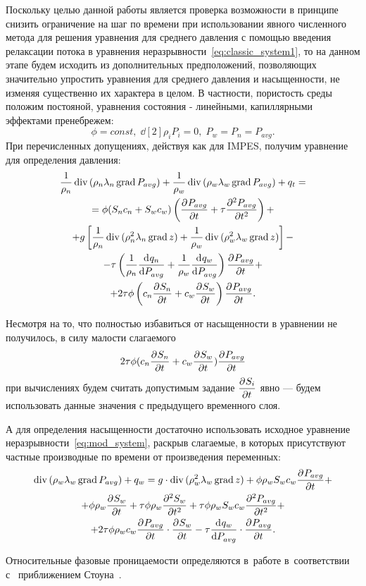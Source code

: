 Поскольку целью данной работы является проверка возможности в принципе снизить ограничение на шаг по времени при
использовании явного численного метода для решения уравнения для среднего давления
с помощью введения релаксации потока в уравнения неразрывности~\eqref{eq:classic_system1}, то на данном этапе
будем исходить из дополнительных предположений, позволяющих значительно упростить уравнения для среднего давления
и насыщенности, не изменяя существенно их характера в целом. В частности, пористость среды положим постояной,
уравнения состояния - линейными, капиллярными эффектами пренебрежем:
\begin{equation}
\phi = const,\; \dd[2]{\rho_i}{P_i} = 0,\;P_w = P_n = P_{avg}.
\end{equation}
При перечисленных допущениях, действуя как для IMPES, получим уравнение для определения давления:
\begin{equation} \label{eq:mod_pressure}
 \begin{gathered}
  \frac{1}{\rho_n} \diver{ (\rho_n\lambda_n\grad{ P_{avg}})} + \frac{1}{\rho_w} \diver{ (\rho_w\lambda_w\grad{ P_{avg}})} + q_t =\\
  = \phi (S_n c_n + S_w c_w) \left( \pd{P_{avg}}{t} + \tau \pd[2]{P_{avg}}{t} \right) +\\
  + g \left[ \frac{1}{\rho_n} \diver{ (\rho_n^2\lambda_n\grad{ z})} + \frac{1}{\rho_w} \diver{ (\rho_w^2\lambda_w\grad{ z})} \right]  -\\
  -  \tau \left(\frac{1}{\rho_n}\dd{q_n}{P_{avg}} + \frac{1}{\rho_w}\dd{q_w}{P_{avg}}\right) \pd{P_{avg}}{t} +\\
  + 2 \tau \phi \left(c_n \pd{S_n}{t} + c_w\pd{S_w}{t}\right) \pd{P_{avg}}{t}.
 \end{gathered}
\end{equation}

Несмотря на то, что полностью избавиться от насыщенности в уравнении не получилось, в силу малости слагаемого
\begin{equation*}
 2 \tau \phi (c_n \pd{S_n}{t} + c_w\pd{S_w}{t}) \pd{P_{avg}}{t}
\end{equation*}
при вычислениях будем считать допустимым задание $\pd{S_i}{t}$ явно --- будем использовать данные
значения с предыдущего временного слоя.

А для определения насыщенности достаточно использовать исходное уравнение неразрывности~\eqref{eq:mod_system},
раскрыв слагаемые, в которых присутствуют частные производные по времени от произведения переменных:
\begin{equation} \label{eq:mod_saturation}
 \begin{gathered}
  \diver{ (\rho_w\lambda_w \grad{ P_{avg}})} + q_w = g \cdot \diver{ (\rho_w^2\lambda_w \grad{ z})} + \phi \rho_w S_w c_w  \pd{P_{avg}}{t} +\\
  + \phi \rho_w \pd{S_w}{t} + \tau \phi \rho_w \pd[2]{S_w}{t} + \tau \phi \rho_w S_w c_w \pd[2]{P_{avg}}{t} +\\
  + 2 \tau \phi \rho_w c_w \pd{P_{avg}}{t} \cdot \pd{S_w}{t} - \tau \dd{q_w}{P_{avg}} \cdot \pd{P_{avg}}{t}.
 \end{gathered}
\end{equation}

Относительные фазовые проницаемости определяются в~работе в~соответствии с~
приближением Стоуна~\cite{Aziz-Settari}.
